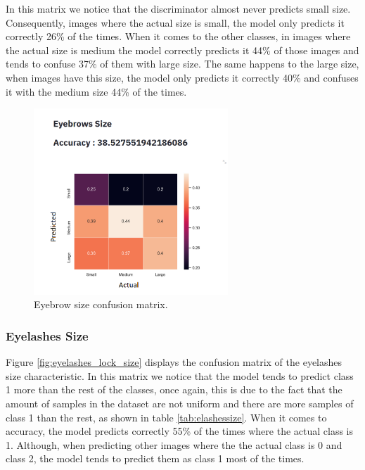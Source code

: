 \documentclass[12pt,a4paper,oneside]{memoir}
\begin{document}
\par

 In this matrix we notice that the discriminator almost never predicts small size. Consequently, images where the actual size is small, the model only predicts it correctly 26\% of the times. When it comes to the other classes, in images where the actual size is medium the model correctly predicts it 44\% of those images and tends to confuse 37\% of them with large size. The same happens to the large size, when images have this size, the model only predicts it correctly 40\% and confuses it with the medium size 44\% of the times.    



\begin{figure}[H]
\centering
\includegraphics[width=0.65\textwidth]{images/eyebrows_lock_size.png}
\caption{Eyebrow size confusion matrix.}
\centering
\label{fig:eyebrow_lock_size}
\end{figure}


\subsubsection{Eyelashes Size}
Figure \ref{fig:eyelashes_lock_size} displays the confusion matrix of the eyelashes size characteristic. In this matrix we notice that the model tends to predict class 1 more than the rest of the classes, once again, this is due to the fact that the amount of samples in the dataset are not uniform and there are more samples of class 1 than the rest, as shown in table \ref{tab:elashessize}. When it comes to accuracy, the model predicts correctly 55\% of the times where the actual class is 1. Although, when predicting other images where the the actual class is 0 and class 2, the model tends to predict them as class 1 most of the times. 
\end{document}
